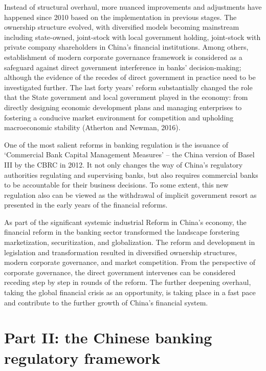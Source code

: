 \documentclass[
  letterpaper,
  DIV=11,
  numbers=noendperiod]{scrreprt}
\begin{document}
Instead of structural overhaul, more nuanced improvements and
adjustments have happened since 2010 based on the implementation in
previous stages. The ownership structure evolved, with diversified
models becoming mainstream including state-owned, joint-stock with local
government holding, joint-stock with private company shareholders in
China's financial institutions. Among others, establishment of modern
corporate governance framework is considered as a safeguard against
direct government interference in banks' decision-making; although the
evidence of the recedes of direct government in practice need to be
investigated further. The last forty years' reform substantially changed
the role that the State government and local government played in the
economy: from directly designing economic development plans and managing
enterprises to fostering a conducive market environment for competition
and upholding macroeconomic stability (Atherton and Newman, 2016).

One of the most salient reforms in banking regulation is the issuance of
`Commercial Bank Capital Management Measures' -- the China version of
Basel III by the CBRC in 2012. It not only changes the way of China's
regulatory authorities regulating and supervising banks, but also
requires commercial banks to be accountable for their business
decisions. To some extent, this new regulation also can be viewed as the
withdrawal of implicit government resort as presented in the early years
of the financial reforms.

As part of the significant systemic industrial Reform in China's
economy, the financial reform in the banking sector transformed the
landscape forstering marketization, securitization, and globalization.
The reform and development in legislation and transformation resulted in
diversified ownership structures, modern corporate governance, and
market competition. From the perspective of corporate governance, the
direct government intervenes can be considered receding step by step in
rounds of the reform. The further deepening overhaul, taking the global
financial crisis as an opportunity, is taking place in a fast pace and
contribute to the further growth of China's financial system.

\section{Part II: the Chinese banking regulatory
framework}\label{part-ii-the-chinese-banking-regulatory-framework}
\end{document}
